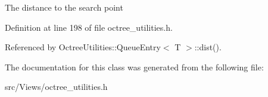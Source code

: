 The distance to the search point 

Definition at line 198 of file octree\_\-utilities.h.

Referenced by OctreeUtilities::QueueEntry$<$ T $>$::dist().

The documentation for this class was generated from the following file:\begin{CompactItemize}
\item 
src/Views/octree\_\-utilities.h\end{CompactItemize}
